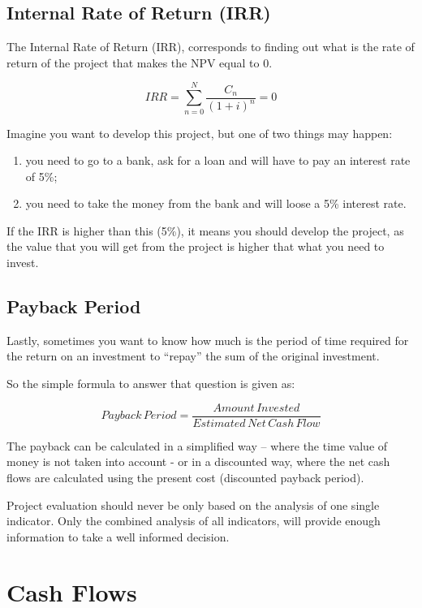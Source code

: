 \documentclass[]{book}
\providecommand{\tightlist}{%
  \setlength{\itemsep}{0pt}\setlength{\parskip}{0pt}}
\theoremstyle{definition}
\theoremstyle{definition}
\theoremstyle{definition}
\theoremstyle{remark}
\begin{document}
\subsection{Internal Rate of Return
(IRR)}\label{internal-rate-of-return-irr}

The Internal Rate of Return (IRR), corresponds to finding out what is
the rate of return of the project that makes the NPV equal to 0.

\[IRR=  \sum_{n=0}^{N}\frac{C_n}{(1+i)^n} = 0\]

Imagine you want to develop this project, but one of two things may
happen:

\begin{enumerate}
\def\labelenumi{\arabic{enumi})}
\tightlist
\item
  you need to go to a bank, ask for a loan and will have to pay an
  interest rate of 5\%;
\item
  you need to take the money from the bank and will loose a 5\% interest
  rate.
\end{enumerate}

If the IRR is higher than this (5\%), it means you should develop the
project, as the value that you will get from the project is higher that
what you need to invest.

\subsection{Payback Period}\label{payback-period}

Lastly, sometimes you want to know how much is the period of time
required for the return on an investment to ``repay'' the sum of the
original investment.

So the simple formula to answer that question is given as:

\[Payback \, Period = \frac{Amount\,Invested}{Estimated\,Net\,Cash\,Flow}\]

The payback can be calculated in a simplified way -- where the time
value of money is not taken into account - or in a discounted way, where
the net cash flows are calculated using the present cost (discounted
payback period).

Project evaluation should never be only based on the analysis of one
single indicator. Only the combined analysis of all indicators, will
provide enough information to take a well informed decision.

\section{Cash Flows}\label{cash-flows}
\end{document}
